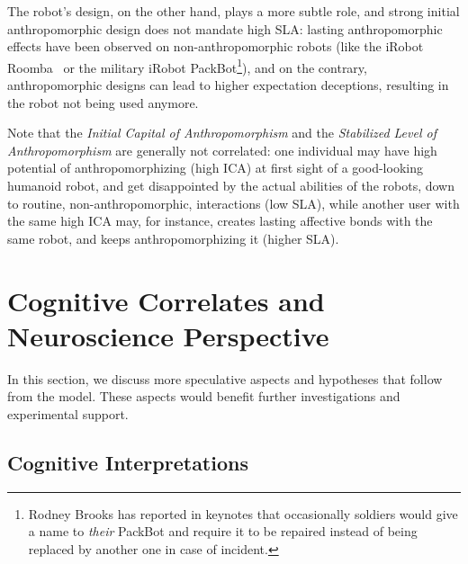 \documentclass{frontiersSCNS} %
\begin{document}
The robot's design, on the other hand, plays a more subtle role, and strong
initial anthropomorphic design does not mandate high SLA: lasting
anthropomorphic effects have been observed on non-anthropomorphic robots (like
the iRobot Roomba~\cite{fink_living_2013} or the military iRobot
PackBot\footnote{Rodney Brooks has reported in keynotes that occasionally
soldiers would give a name to \emph{their} PackBot and require it to be repaired
instead of being replaced by another one in case of incident.}), and on the
contrary, anthropomorphic designs can lead to higher expectation deceptions,
resulting in the robot not being used anymore.

Note that the \emph{Initial Capital of Anthropomorphism} and the
\emph{Stabilized Level of Anthropomorphism} are generally not correlated: one
individual may have high potential of anthropomorphizing (high ICA) at first
sight of a good-looking humanoid robot, and get disappointed by the actual
abilities of the robots, down to routine, non-anthropomorphic, interactions (low
SLA), while another user with the same high ICA may, for instance, creates
lasting affective bonds with the same robot, and keeps anthropomorphizing it
(higher SLA).



%
%
%
%
%
%
%
%
%

\section{Cognitive Correlates and Neuroscience Perspective}
\label{sec:cognition-neuroscience}

In this section, we discuss more speculative aspects and hypotheses that follow
from the model. These aspects would benefit further investigations and
experimental support.

\subsection{Cognitive Interpretations}
\label{sec:cognitive-model}
\end{document}
